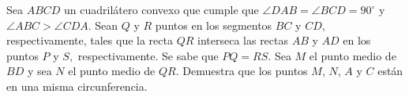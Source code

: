 Sea $ABCD$ un cuadrilátero convexo que cumple que $\angle DAB = \angle BCD = 90^{\circ}$ y
$\angle ABC \gt \angle CDA$. Sean $Q$ y $R$ puntos en los segmentos $BC$ y $CD,$ respectivamente, tales que la recta
$QR$ interseca las rectas $AB$ y $AD$ en los puntos $P$ y $S,$ respectivamente. Se sabe que $PQ = RS.$ Sea
$M$ el punto medio de $BD$ y sea $N$ el punto medio de $QR.$ Demuestra que los puntos $M$, $N $, $A$ y $C$
están en una misma circunferencia.